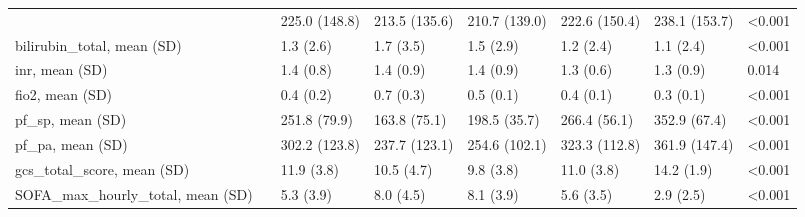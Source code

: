\begin{tabular}{llllllll}
{{{platelets, mean (SD) &  & 225.0 (148.8) & 213.5 (135.6) & 210.7 (139.0) & 222.6 (150.4) & 238.1 (153.7) & <0.001 \\
\cline{1-8}
bilirubin_total, mean (SD) &  & 1.3 (2.6) & 1.7 (3.5) & 1.5 (2.9) & 1.2 (2.4) & 1.1 (2.4) & <0.001 \\
\cline{1-8}
inr, mean (SD) &  & 1.4 (0.8) & 1.4 (0.9) & 1.4 (0.9) & 1.3 (0.6) & 1.3 (0.9) & 0.014 \\
\cline{1-8}
fio2, mean (SD) &  & 0.4 (0.2) & 0.7 (0.3) & 0.5 (0.1) & 0.4 (0.1) & 0.3 (0.1) & <0.001 \\
\cline{1-8}
pf_sp, mean (SD) &  & 251.8 (79.9) & 163.8 (75.1) & 198.5 (35.7) & 266.4 (56.1) & 352.9 (67.4) & <0.001 \\
\cline{1-8}
pf_pa, mean (SD) &  & 302.2 (123.8) & 237.7 (123.1) & 254.6 (102.1) & 323.3 (112.8) & 361.9 (147.4) & <0.001 \\
\cline{1-8}
gcs_total_score, mean (SD) &  & 11.9 (3.8) & 10.5 (4.7) & 9.8 (3.8) & 11.0 (3.8) & 14.2 (1.9) & <0.001 \\
\cline{1-8}
SOFA_max_hourly_total, mean (SD) &  & 5.3 (3.9) & 8.0 (4.5) & 8.1 (3.9) & 5.6 (3.5) & 2.9 (2.5) & <0.001 \\
\cline{1-8}
\bottomrule
\end{tabular}
